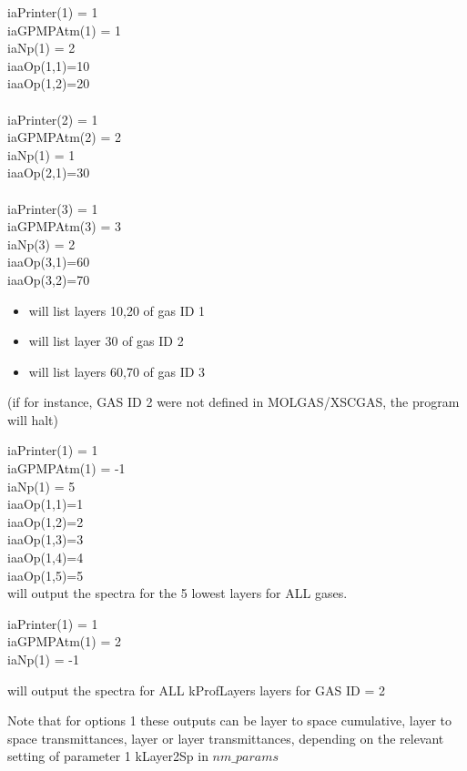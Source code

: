 \documentclass[12pt]{article}
\newcommand{\ttab}{\indent\indent}
\begin{document}
{{\medskip
\medskip
\ttab iaPrinter(1) = 1\\
\ttab iaGPMPAtm(1) = 1\\
\ttab iaNp(1) = 2\\
\ttab iaaOp(1,1)=10\\
\ttab iaaOp(1,2)=20\\
\ttab \\
\ttab iaPrinter(2) = 1\\
\ttab iaGPMPAtm(2) = 2\\
\ttab iaNp(1) = 1\\
\ttab iaaOp(2,1)=30\\
\ttab \\
\ttab iaPrinter(3) = 1\\
\ttab iaGPMPAtm(3) = 3\\
\ttab iaNp(3) = 2\\
\ttab iaaOp(3,1)=60\\
\ttab iaaOp(3,2)=70\\

\begin{itemize}
\item will list layers 10,20  of gas ID 1
\item will list layer  30     of gas ID 2
\item will list layers 60,70  of gas ID 3
\end{itemize}
(if for instance, GAS ID 2 were not defined in MOLGAS/XSCGAS, the program 
will halt)

\medskip
\medskip
\ttab iaPrinter(1) = 1\\
\ttab iaGPMPAtm(1) = -1\\
\ttab iaNp(1) = 5\\
\ttab iaaOp(1,1)=1\\
\ttab iaaOp(1,2)=2\\
\ttab iaaOp(1,3)=3\\
\ttab iaaOp(1,4)=4\\
\ttab iaaOp(1,5)=5\\

\smallskip\noindent
will output the spectra for the 5 lowest layers for ALL gases.

\medskip
\medskip
\ttab iaPrinter(1) = 1\\
\ttab iaGPMPAtm(1) = 2\\ 
\ttab iaNp(1) = -1\

\smallskip\noindent
will output the spectra for ALL kProfLayers layers for GAS ID = 2

\medskip
Note that for options 1 these outputs can be layer to space cumulative, 
layer to space transmittances, layer or layer transmittances, depending on 
the relevant setting of parameter 1 {\sf kLayer2Sp} in $nm\_params$

}}
\end{document}
